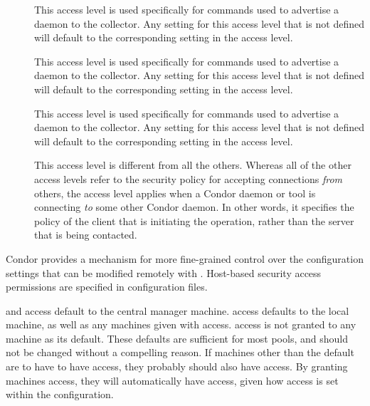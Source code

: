 \begin{description}
\item[] \label{dcperm:advertise-master} This
   access level is used specifically for commands used to advertise a
    daemon to the collector.  Any setting for this access
   level that is not defined will default to the corresponding setting
   in the  access level.

\item[] \label{dcperm:advertise-startd} This
   access level is used specifically for commands used to advertise a
    daemon to the collector.  Any setting for this access
   level that is not defined will default to the corresponding setting
   in the  access level.

\item[] \label{dcperm:advertise-schedd} This
   access level is used specifically for commands used to advertise a
    daemon to the collector.  Any setting for this access
   level that is not defined will default to the corresponding setting
   in the  access level.

\item[] \label{dcperm:client} This access level is
   different from all the others.  Whereas all of the other access levels
   refer to the security policy for accepting connections \emph{from} others,
   the  access level applies when a Condor daemon or tool is
   connecting \emph{to} some other Condor daemon.  In other words, it specifies
   the policy of the client that is initiating the operation, rather than
   the server that is being contacted.

\end{description}

Condor provides a mechanism for more
fine-grained control over the configuration settings that can be
modified remotely with .  
Host-based security access
permissions are specified in configuration files.

 and  access default to 
the central manager machine.
 access defaults to the local machine, as well as
any machines
given with  access.
 access is not granted to any machine
as its default.
These defaults are sufficient for most pools, and should not be changed without
a compelling reason.
If machines other than the default are to have to have 
access, they probably should also have  access.
By granting machines  access, they
will automatically have  access, given how
 access is set within the configuration.

